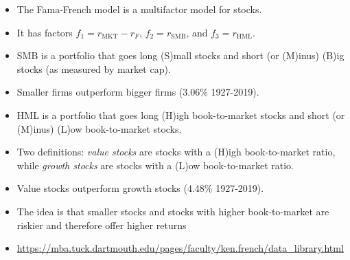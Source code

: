 \documentclass{beamer}
\begin{document}
\begin{frame}{}
	\begin{itemize}
		\item The Fama-French model is a  multifactor model for stocks. 
		\item It has factors $f_{1}=r_{\text{MKT}}-r_{F}$, $f_{2}=r_{\text{SMB}}$, and $f_{3}=r_{\text{HML}}$.
		\item SMB is a portfolio that goes long (S)mall stocks and short (or (M)inus) (B)ig stocks (as measured by market cap).
		\item Smaller firms outperform bigger firms (3.06\% 1927-2019). 
		\item HML is a portfolio that goes long (H)igh book-to-market stocks and short (or (M)inus) (L)ow book-to-market stocks. 
		\item Two definitions: \textit{value stocks} are stocks with a (H)igh book-to-market ratio, while \textit{growth stocks} are stocks with a (L)ow book-to-market ratio.  
		\item Value stocks outperform growth stocks (4.48\% 1927-2019).
		\item The idea is that smaller stocks and stocks with higher book-to-market are riskier and therefore offer higher returns
		\item \url{https://mba.tuck.dartmouth.edu/pages/faculty/ken.french/data_library.html}
	\end{itemize}
\end{frame}
\end{document}
